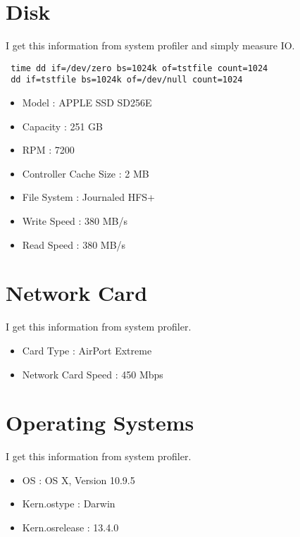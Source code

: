 \section{Disk}
I get this information from system profiler and simply measure IO.

\begin{verbatim}
 time dd if=/dev/zero bs=1024k of=tstfile count=1024
 dd if=tstfile bs=1024k of=/dev/null count=1024
\end{verbatim}

\begin{itemize}
\item Model : APPLE SSD SD256E
\item Capacity : 251 GB
\item RPM : 7200
\item Controller Cache Size : 2 MB
\item File System : Journaled HFS+
\item Write Speed : 380 MB/s
\item Read Speed : 380 MB/s
\end{itemize}

\section{Network Card}
I get this information from system profiler.

\begin{itemize}
\item Card Type : AirPort Extreme
\item Network Card Speed : 450 Mbps
\end{itemize}

\section{Operating Systems}
I get this information from system profiler.

\begin{itemize}
\item OS : OS X, Version 10.9.5
\item Kern.ostype : Darwin
\item Kern.osrelease : 13.4.0
\end{itemize}

